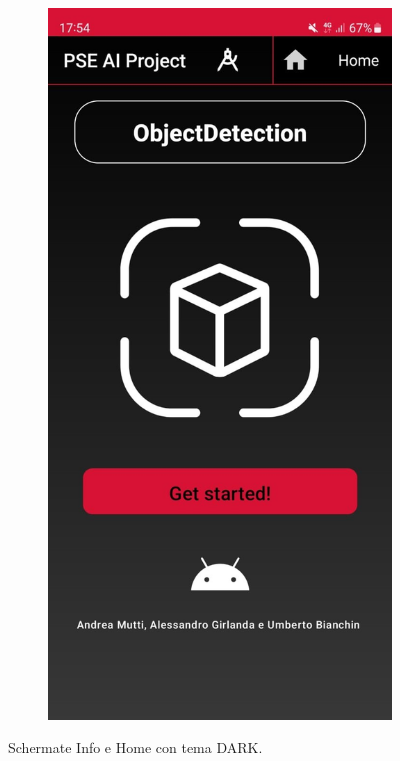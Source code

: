 \begin{figure}[H]
\begin{subfigure}[b]{0.3\textwidth}
  \end{subfigure}
  \begin{subfigure}[b]{0.3\textwidth}
    \includegraphics[width=\textwidth, height=0.4\textheight]{Immagini/App/home_scuro.jpeg}
  \end{subfigure}
  \caption{Schermate Info e Home con tema DARK.}
  \label{fig:dark2}
\end{figure}

